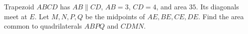 Trapezoid $ABCD$ has $AB\parallel CD$, $AB=3$, $CD=4$, and area $35$. Its diagonals meet at $E$. Let $M,N,P,Q$ be the midpoints of $AE,BE,CE,DE$. Find the area common to quadrilaterals $ABPQ$ and $CDMN$.
